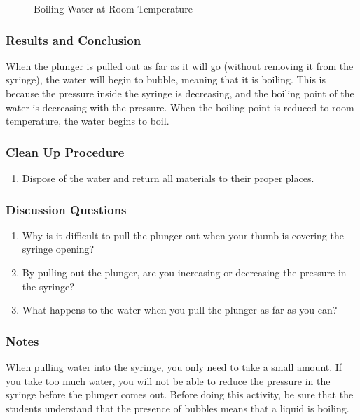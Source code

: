 \begin{figure}
\begin{center}
\def\svgwidth{150pt}

\caption{Boiling Water at Room Temperature}
\label{fig:boiling-room-temp}
\end{center}
\end{figure}

\subsubsection*{Results and Conclusion}
When the plunger is pulled out as far as it will go (without removing it from the syringe), the water will begin to bubble, meaning that it is boiling. This is because the pressure inside the syringe is decreasing, and the boiling point of the water is decreasing with the pressure. When the boiling point is reduced to room temperature, the water begins to boil.  

\subsubsection*{Clean Up Procedure}
\begin{enumerate}
\item{Dispose of the water and return all materials to their proper places.} 
\end{enumerate}

\subsubsection*{Discussion Questions}
\begin{enumerate}
\item{Why is it difficult to pull the plunger out when your thumb is covering the syringe opening?}
\item{By pulling out the plunger, are you increasing or decreasing the pressure in the syringe?}
\item{What happens to the water when you pull the plunger as far as you can?}
\end{enumerate}

\subsubsection*{Notes}
When pulling water into the syringe, you only need to take a small amount. If you take too much water, you will not be able to reduce the pressure in the syringe before the plunger comes out.  
Before doing this activity, be sure that the students understand that the presence of bubbles means that a liquid is boiling.
